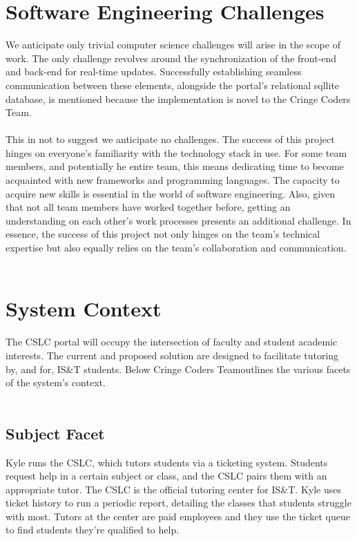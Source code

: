 \documentclass[oneside,openany,obeyspaces]{book}
\newcommand\tab[1][1cm]{\hspace*{#1}}
\newcommand\TeamName{Cringe Coders Team}
\begin{document}
\begin{flushleft}
    \section{Software Engineering Challenges}

    \tab We anticipate only trivial computer science challenges will arise in the scope of work. The only challenge revolves around the synchronization of the front-end and back-end for real-time updates. Successfully establishing seamless communication between these elements, alongside the portal’s relational sqllite database, is mentioned because the implementation is novel to the \TeamName.\\~\\

    \tab This in not to suggest we anticipate no challenges. The success of this project hinges on everyone’s familiarity with the technology stack in use. For some team members, and potentially he entire team, this means dedicating time to become acquainted with new frameworks and programming languages. The capacity to acquire new skills is essential in the world of software engineering. Also, given that not all team members have worked together before, getting an understanding on each other’s work processes presents an additional challenge. In essence, the success of this project not only hinges on the team’s technical expertise but also equally relies on the team’s collaboration and communication.\\~\\


    \section{System Context}

    \tab The CSLC portal will occupy the intersection of faculty and student academic interests. The current and proposed solution are designed to facilitate tutoring by, and for, IS\&T students. Below \TeamName\space outlines the various facets of the system's context.\\~\\

    \subsection{Subject Facet}

    \tab Kyle runs the CSLC, which tutors students via a ticketing system. Students request help in a certain subject or class, and the CSLC pairs them with an appropriate tutor. The CSLC is the official tutoring center for IS\&T. Kyle uses ticket history to run a periodic report, detailing the classes that students struggle with most. Tutors at the center are paid employees and they use the ticket queue to find students they’re qualified to help.\\~\\


\end{flushleft}
\end{document}

